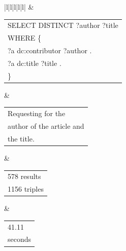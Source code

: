 \documentclass[12pt]{article}
\begin{document}
{\begin{tabular}{|l|l|l|l|l|}
			  & \begin{tabular}[c]{@{}l@{}}SELECT DISTINCT ?author ?title\\ WHERE \{\\       ?a dc:contributor ?author .\\       ?a dc:title ?title .\\ \}\end{tabular}                                                                                                                                                                                                                                                                                                                                  & \begin{tabular}[c]{@{}l@{}}Requesting for the \\ author of the article and\\ the title.\end{tabular}                                                                 & \begin{tabular}[c]{@{}l@{}}578 results\\ 1156 triples\end{tabular}  & \begin{tabular}[c]{@{}l@{}}41.11 \\ seconds\end{tabular}  \\  

\end{tabular}}
\end{document}
